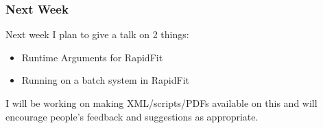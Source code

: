 \documentclass{beamer}
\begin{document}
\begin{frame}
\frametitle{Next Week}
Next week I plan to give a talk on 2 things:\newline
\begin{itemize}
 \item Runtime Arguments for RapidFit
 \item Running on a batch system in RapidFit\newline
\end{itemize}

I will be working on making XML/scripts/PDFs available on this and will encourage people's feedback and suggestions as appropriate.\newline

\end{frame}
\end{document}
